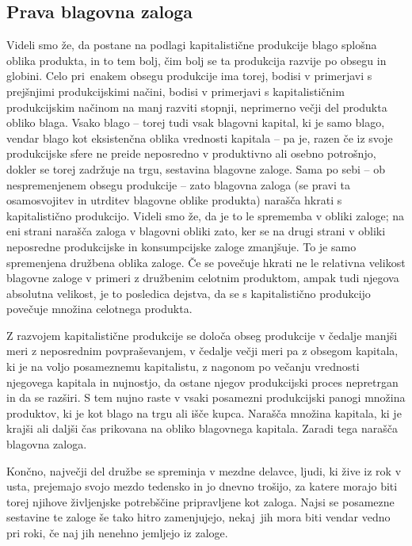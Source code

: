 \documentclass[kapital_02.tex]{subfiles}
\begin{document}
\subsection{Prava blagovna zaloga}
Videli smo že, da postane na podlagi kapitalistične produkcije blago splošna oblika produkta, in to tem bolj, čim bolj se ta produkcija razvije po obsegu in globini.
Celo pri\KPEstran\ enakem obsegu produkcije ima torej, bodisi v primerjavi s prejšnjimi produkcijskimi načini, bodisi v primerjavi s kapitalističnim produkcijskim načinom na manj razviti stopnji, neprimerno večji del produkta obliko blaga.
Vsako blago -- torej tudi vsak blagovni kapital, ki je samo blago, vendar blago kot eksistenčna oblika vrednosti kapitala -- pa je, razen če iz svoje produkcijske sfere ne preide neposredno v produktivno ali osebno potrošnjo, dokler se torej zadržuje na trgu, sestavina blagovne zaloge.
Sama po sebi -- ob nespremenjenem obsegu produkcije -- zato blagovna zaloga (se pravi ta osamosvojitev in utrditev blagovne oblike produkta) narašča hkrati s kapitalistično produkcijo.
Videli smo že, da je to le sprememba v obliki zaloge; na eni strani narašča zaloga v blagovni obliki zato, ker se na drugi strani v obliki neposredne produkcijske in konsumpcijske zaloge zmanjšuje.
To je samo spremenjena družbena oblika zaloge.
Če se povečuje hkrati ne le relativna velikost blagovne zaloge v primeri z družbenim celotnim produktom, ampak tudi njegova absolutna velikost, je to posledica dejstva, da se s kapitalistično produkcijo povečuje množina celotnega produkta.

Z razvojem kapitalistične produkcije se določa obseg produkcije v čedalje manjši meri z neposrednim povpraševanjem, v čedalje večji meri pa z obsegom kapitala, ki je na voljo posameznemu kapitalistu, z nagonom po večanju vrednosti njegovega kapitala in nujnostjo, da ostane njegov produkcijski proces nepretrgan in da se razširi.
S tem nujno raste v vsaki posamezni produkcijski panogi množina produktov, ki je kot blago na trgu ali išče kupca.
Narašča množina kapitala, ki je krajši ali daljši čas prikovana na obliko blagovnega kapitala.
Zaradi tega narašča blagovna zaloga.

Končno, največji del družbe se spreminja v mezdne delavce, ljudi, ki žive iz rok v usta, prejemajo svojo mezdo tedensko in jo dnevno trošijo, za katere morajo biti torej njihove življenjske potrebščine pripravljene kot zaloga.
Najsi se posamezne sestavine te zaloge še tako hitro zamenjujejo, nekaj\KPEstran\ jih mora biti vendar vedno pri roki, če naj jih nenehno jemljejo iz zaloge.
\end{document}
